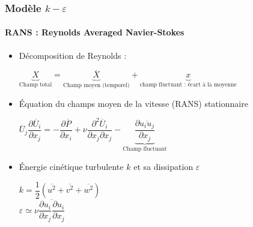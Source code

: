 \documentclass[12pt, xcolor=svgnames]{beamer}
\newcommand{\keps}{$k-\varepsilon$}
\newcommand{\bwarrow}{\item[\color{DarkRed} \ding{227}]}
\newcommand{\warrow}{\item[\color{blue!50!black!70} \tiny{\ding{109}}]}
\newcommand{\bepar}[1]{
	\left( #1 \right)  
}
\begin{document}
\begin{frame}
\frametitle{Modèle \keps $ $}
\framesubtitle{RANS : Reynolds Averaged Navier-Stokes}
\begin{itemize}
\bwarrow Décomposition de Reynolds : \\ \begin{center}$ \displaystyle \underbrace{X}_{\text{Champ total}} = \underbrace{\overline{X}}_{\text{Champ moyen (temporel)}} + \underbrace{x}_{\text{champ fluctuant : écart à la moyenne}} $ \end{center}
\end{itemize} 
\begin{itemize}
\bwarrow Équation du champs moyen de la vitesse (RANS) stationnaire\\
\begin{center}$\displaystyle \overline{U}_j \dfrac{\partial \overline{U}_i}{\partial x_j} = -\dfrac{\partial \overline{P}}{\partial x_i} + \nu \dfrac{\partial^2 \overline{U}_i}{\partial x_j \partial x_j } - \underbrace{\dfrac{\partial \overline{u_iu_j}}{\partial x_j}}_{\text{Champ fluctuant}}$  \end{center} 

\bwarrow Énergie cinétique turbulente $k$ et sa dissipation $\varepsilon$\\ \begin{center} $k = \dfrac{1}{2} \displaystyle \bepar{\overline{u^2} + \overline{v^2} + \overline{w^2}}$ \\ $\displaystyle \varepsilon \simeq \nu \overline{\dfrac{\partial u_i}{\partial x_j}\dfrac{\partial u_i}{\partial x_j}} $ \end{center}

\end{itemize}

\end{frame}
\end{document}
